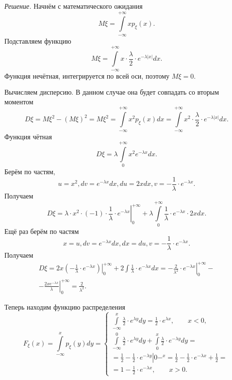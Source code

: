 \textit{Решение.} Начнём с математического ожидания
$$M \xi =
\int \limits_{- \infty }^{+ \infty }xp_{ \xi } \left( x \right).$$
Подставляем функцию
$$M \xi =
\int \limits_{- \infty }^{+ \infty } x \cdot \frac{ \lambda }{2} \cdot e^{- \lambda \left| x \right| } dx.$$
Функция нечётная, интегрируется по всей оси, поэтому $M \xi = 0$.

Вычисляем дисперсию.
В данном случае она будет совпадать со вторым моментом
$$D \xi =
M \xi^2 - \left( M \xi \right)^2 =
M \xi^2 =
\int \limits_{- \infty }^{+ \infty } x^2 p_{ \xi } \left( x \right) dx =
\int \limits_{- \infty }^{+ \infty } x^2 \cdot \frac{ \lambda }{2} \cdot e^{- \lambda \left| x \right| } dx.$$
Функция чётная
$$D \xi =
\lambda \int \limits_0^{+ \infty } x^2 e^{- \lambda x} dx.$$
Берём по частям,
$$u = x^2,
dv = e^{- \lambda x} dx,
du = 2xdx,
v = - \frac{1}{ \lambda } \cdot e^{- \lambda x}.$$
Получаем
$$D \xi =
\left. \lambda \cdot x^2 \cdot \left( -1 \right) \cdot \frac{1}{ \lambda } \cdot e^{- \lambda x} \right|_0^{+ \infty } +
\lambda \int \limits_0^{+ \infty } \frac{1}{ \lambda } \cdot e^{- \lambda x} \cdot 2xdx.$$
Ещё раз берём по частям
$$x = u,
dv = e^{- \lambda x}dx,
dx = du,
v = - \frac{1}{ \lambda } \cdot e^{- \lambda x}.$$
Получаем
\begin{equation*}
\begin{split}
D \xi =
\left. 2x \left( - \frac{1}{ \lambda } \cdot e^{- \lambda x} \right) \right|_0^{+ \infty } +
2 \int \frac{1}{ \lambda } \cdot e^{- \lambda x} dx =
\left. - \frac{2}{ \lambda^2} \cdot e^{- \lambda x} \right|_0^{+ \infty } - \\
- \left. \frac{2xe^{- \lambda x}}{ \lambda } \right|_0^{+ \infty } =
\frac{2}{ \lambda^2}.
\end{split}
\end{equation*}

Теперь находим функцию распределения
$$F_{ \xi } \left( x \right) =
\int \limits_{- \infty }^{x} p_{ \xi } \left( y \right) dy =
\begin{cases}
\int \limits_{- \infty }^x \frac{ \lambda }{2} \cdot e^{ \lambda y} dy =
\frac{1}{2} \cdot e^{ \lambda x}, \qquad x < 0, \\
\int \limits_{- \infty }^0 \frac{ \lambda }{2} \cdot e^{ \lambda y} dy + \int \limits_0^x \frac{ \lambda }{2} \cdot e^{- \lambda y} dy = \\
= \left. \frac{1}{2} - \frac{1}{2} \cdot e^{- \lambda y} \right|0-^x =
\frac{1}{2} - \frac{1}{2} \cdot e^{- \lambda x} + \frac{1}{2} = \\
= 1 - \frac{1}{2} \cdot e^{- \lambda x}, \qquad x > 0.
\end{cases}$$

